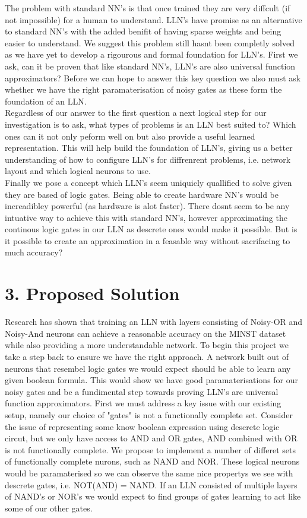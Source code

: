 \documentclass[11pt, a4paper, twoside, openright]{report}
\begin{document}
The problem with standard NN's is that once trained they are very diffcult (if not impossible) for a human to understand. LLN's have promise as an alternative to standard NN's with the added benifit of having sparse weights and being easier to understand. We suggest this problem still hasnt been completly solved as we have yet to develop a rigourous and formal foundation for LLN's. First we ask, can it be proven that like standard NN's, LLN's are also universal function approximators?  Before we can hope to answer this key question we also must ask whether we have the right paramaterisation of noisy gates as these form the foundation of an LLN. \\

Regardless of our answer to the first question a next logical step for our investigation is to ask, what types of problems is an LLN best suited to? Which ones can it not only peform well on but also provide a useful learned representation. This will help build the foundation of LLN's, giving us a better understanding of how to configure LLN's for diffrenrent problems, i.e. network layout and which logical neurons to use.\\

Finally we pose a concept which LLN's seem uniquicly quallified to solve given they are based of logic gates. Being able to create hardware NN's would be increadibley powerful (as hardware is alot faster). There dosnt seem to be any intuative way to achieve this with standard NN's, however approximating the continous logic gates in our LLN as descrete ones would make it possible. But is it possible to create an approximation in a feasable way without sacrifacing to much accuracy?

\section*{3. Proposed Solution}

Research has shown that training an LLN with layers consisting of Noisy-OR and Noisy-And neurons can achieve a reasonable accuracy on the MINST dataset while also providing a more understandable network. To begin this project we take a step back to ensure we have the right approach. A network built out of neurons that resembel logic gates we would expect should be able to learn any given boolean formula. This would show we have good paramaterisations for our noisy gates and be a fundimental step towards proving LLN's are universal function approximators. First we must address a key issue with our existing setup, namely our choice of "gates" is not a functionally complete set. Consider the issue of representing some know boolean expression using descrete logic circut, but we only have access to AND and OR gates, AND combined with OR is not functionally complete. We propose to implement a number of differet sets of functionally complete nurons, such as NAND and NOR. These logical neurons would be paramaterised so we can observe the same nice propertys we see with descrete gates, i.e. NOT(AND) = NAND. If an LLN consisted of multiple layers of NAND's or NOR's we would expect to find groups of gates learning to act like some of our other gates. \\
\end{document}
